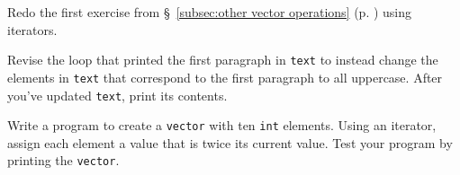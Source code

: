 %
%
\begin{question}
Redo the first exercise from \S~\ref{subsec:other vector operations} (p. \pageref{subsec:other vector operations}) using iterators.
\end{question}

\begin{question}
Revise the loop that printed the first paragraph in \verb|text| to
instead change the elements in \verb|text| that correspond to the first paragraph
to all uppercase. After you’ve updated \verb|text|, print its contents.
\end{question}

\begin{question}
Write a program to create a \verb|vector| with ten \verb|int| elements.
Using an iterator, assign each element a value that is twice its current value.
Test your program by printing the \verb|vector|.
\end{question}
